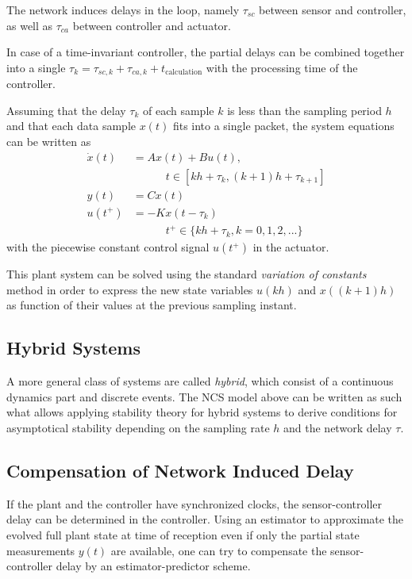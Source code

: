         The network induces delays in the loop, namely $\tau_{sc}$ between sensor and controller, as well as $\tau_{ca}$ between controller and actuator.

        In case of a time-invariant controller, the partial delays can be combined together into a single $\tau_k=\tau_{sc,k}+\tau_{ca,k}+t_{\text{calculation}}$ with the processing time of the controller.

        Assuming that the delay $\tau_k$ of each sample $k$ is less than the sampling period $h$ and that each data sample $x(t)$ fits into a single packet, the system equations can be written as
        \begin{align*}
            \dot{x}(t) &= Ax(t) + Bu(t),\\
            &\quad\quad\quad t\in[kh+\tau_k, (k+1)h+\tau_{k+1}]\\
            y(t) &= Cx(t) \\
            u(t^+) &= -Kx(t-\tau_k)\\
            &\quad\quad\quad t^+\in\{kh+\tau_k, k=0,1,2,...\}
        \end{align*}
        with the piecewise constant control signal $u(t^+)$ in the actuator.

        This plant system can be solved using the standard \textit{variation of constants} method in order to express the new state variables $u(kh)$ and $x((k+1)h)$ as function of their values at the previous sampling instant.

    \subsection{Hybrid Systems}
        A more general class of systems are called \textit{hybrid}, which consist of a continuous dynamics part and discrete events.
        The NCS model above can be written as such what allows applying stability theory for hybrid systems to derive conditions for asymptotical stability depending on the sampling rate $h$ and the network delay $\tau$.

    \subsection{Compensation of Network Induced Delay}
        If the plant and the controller have synchronized clocks, the sensor-controller delay can be determined in the controller.
        Using an estimator to approximate the evolved full plant state at time of reception even if only the partial state measurements $y(t)$ are available, one can try to compensate the sensor-controller delay by an estimator-predictor scheme.

